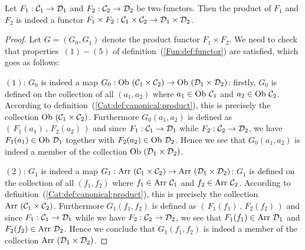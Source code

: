 \begin{prop}\label{Fun:prop:canonical:product}
    Let $F_{1}:\mbox{${\cal C}_{1}$}\to\mbox{${\cal D}_{1}$}$ and $F_{2}:\mbox{${\cal C}_{2}$}\to\mbox{${\cal D}_{2}$}$ be two functors. Then 
    the product of $F_{1}$ and $F_{2}$ is indeed a functor $F_{1}\times F_{2}: 
    \mbox{${\cal C}_{1}$}\times\mbox{${\cal C}_{2}$}\to\mbox{${\cal D}_{1}$}\times\mbox{${\cal D}_{2}$}$.
\end{prop}
\begin{proof}
    Let $G=(G_{0},G_{1})$ denote the product functor $F_{1}\times F_{2}$.
    We need to check that properties~$(1)-(5)$ of 
    definition~(\ref{Fun:def:functor}) are satisfied, which goes as follows:

    $(1)$: $G_{0}$ is indeed a map $G_{0}:\ob\ (\Cone\times\Ctwo)\to\ob\ (\Done
    \times\Dtwo)$: firstly, $G_{0}$ is defined on the 
    collection of all $(a_{1},a_{2})$ where $a_{1}\in\mbox{\rm Ob}\ \mbox{${\cal C}_{1}$}$
    and $a_{2}\in\mbox{\rm Ob}\ \mbox{${\cal C}_{2}$}$. According to 
    definition~(\ref{Cat:def:canonical:product}), this is precisely 
    the collection $\ob\ (\Cone\times\Ctwo)$. Furthermore $G_{0}(a_{1},a_{2})$
    is defined as $(\,F_{1}(a_{1})\,,\,F_{2}(a_{2})\,)$ and since 
    $F_{1}:\mbox{${\cal C}_{1}$}\to\mbox{${\cal D}_{1}$}$ while $F_{2}:\mbox{${\cal C}_{2}$}\to\mbox{${\cal D}_{2}$}$, we have $F_{1}(a_{1})
    \in\mbox{\rm Ob}\ \mbox{${\cal D}_{1}$}$ together with $F_{2}(a_{2})\in\mbox{\rm Ob}\ \mbox{${\cal D}_{2}$}$. Hence we see that
    $G_{0}(a_{1},a_{2})$ is indeed a member of the collection 
    $\ob\ (\Done\times\Dtwo)$.

    $(2)$: $G_{1}$ is indeed a map $G_{1}:\arr\ (\Cone\times\Ctwo)\to\arr\ (\Done
    \times\Dtwo)$: $G_{1}$ is defined on the 
    collection of all $(f_{1},f_{2})$ where $f_{1}\in\mbox{\rm Arr}\ \mbox{${\cal C}_{1}$}$
    and $f_{2}\in\mbox{\rm Arr}\ \mbox{${\cal C}_{2}$}$. According to 
    definition~(\ref{Cat:def:canonical:product}), this is precisely 
    the collection $\arr\ (\Cone\times\Ctwo)$. Furthermore $G_{1}(f_{1},f_{2})$
    is defined as $(\,F_{1}(f_{1})\,,\,F_{2}(f_{2})\,)$ and since 
    $F_{1}:\mbox{${\cal C}_{1}$}\to\mbox{${\cal D}_{1}$}$ while we have $F_{2}:\mbox{${\cal C}_{2}$}\to\mbox{${\cal D}_{2}$}$, we see that
    $F_{1}(f_{1})\in\mbox{\rm Arr}\ \mbox{${\cal D}_{1}$}$ and $F_{2}(f_{2})\in\mbox{\rm Arr}\ \mbox{${\cal D}_{2}$}$. Hence we 
    conclude that $G_{1}(f_{1},f_{2})$ is indeed a member of the collection 
    $\arr\ (\Done\times\Dtwo)$.


\end{proof}

